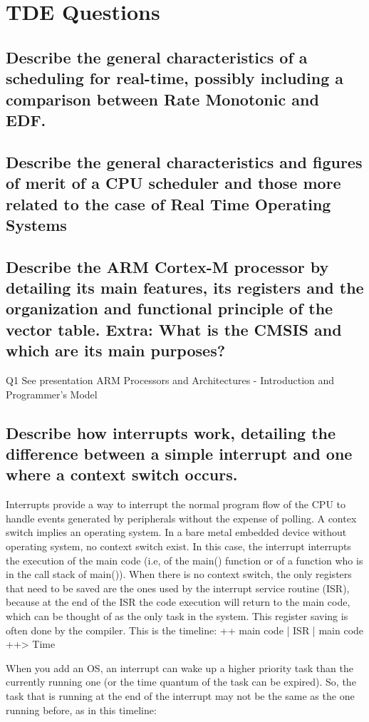 \chapter{TDE Questions}
\section{Describe the general characteristics of a scheduling for real-time, possibly including a comparison between Rate Monotonic and EDF. }



\section{Describe the general characteristics and figures of merit of a CPU scheduler and those more related to the case of Real Time Operating Systems}
\section{Describe the ARM Cortex-M processor by detailing its main features, its registers and the organization and functional principle of the vector table. Extra: What is the CMSIS and which are its main purposes?  }
Q1 See presentation ARM Processors and Architectures - Introduction and Programmer's Model
\section{Describe how interrupts work, detailing the difference between a simple interrupt and one where a context switch occurs.}
Interrupts provide a way to interrupt the normal program flow of the CPU  to handle events generated by peripherals without the expense of polling. A contex switch implies an operating system. In a bare metal embedded device without operating system, no context switch exist. In this case, the interrupt interrupts the execution of the main code (i.e, of the main() function or of a function who is in the call stack of main()). When there is no context switch, the only registers that need to be saved are the ones used by the interrupt service routine (ISR), because at the end of the ISR the code execution will return to the main code, which can be thought of as the only task in the system. This register saving is often done by the compiler. 
This is the timeline:  
++ main code | ISR | main code ++> Time

When you add an OS, an interrupt can wake up a higher priority task than the currently running one (or the time quantum of the task can be expired). So, the task that is running at the end of the interrupt may not be the same as the one running before, as in this timeline: 


